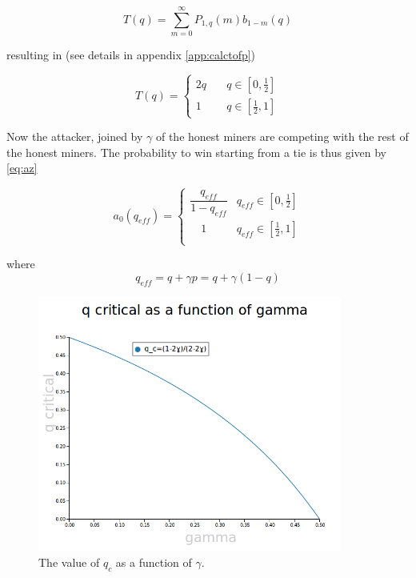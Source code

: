 \documentclass[letterpaper,12pt]{report}
\theoremstyle{plain}
\theoremstyle{definition}
\begin{document}
\begin{equation}\label{eq:qofpdef}
\mathit{T}(q)= \sum_{m=0}^{\infty}\mathit{P}_{1,q}(m)\mathit{b}_{1-m}(q)
\end{equation}

resulting in (see details in appendix \ref{app:calctofp})

\begin{equation}\label{eq:qofp}
\mathit{T}(q)=
\begin{cases}
2q & \quad q \in [0,\frac{1}{2}] \\
1 & \quad q \in [\frac{1}{2},1] 
\end{cases}
\end{equation}

Now the attacker, joined by $\gamma$ of the honest miners are competing with the rest of the honest miners. The probability to win starting from a tie is thus given by \ref{eq:az}

\begin{equation}\label{eq:azeroeff}
\mathit{a}_0(q_{eff})=\begin{cases} \dfrac{q_{eff}}{1-q_{eff}} & q_{eff}\in [0,\frac{1}{2}] \\  
\quad 1 & q_{eff}\in [\frac{1}{2},1] \\ \end{cases}
\end{equation}

where 
\begin{equation}\label{qeff}
q_{eff}=q+\gamma p=q+\gamma(1-q)
\end{equation}

\begin{figure}[qcrit]
\centering
\includegraphics[width=100mm]{qcritical.png}
\caption{The value of $q_c$ as a function of $\gamma$.}
\label{fig:qcritical}
\end{figure}
\end{document}
